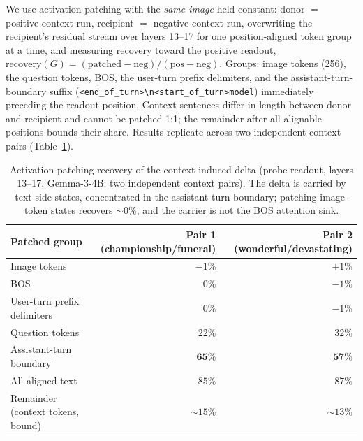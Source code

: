 \documentclass{article}
\newcommand{\gemma}{Gemma-3-4B}
\begin{document}
We use activation patching with the \emph{same image} held constant: donor $=$ positive-context run, recipient $=$ negative-context run, overwriting the recipient's residual stream over layers 13--17 for one position-aligned token group at a time, and measuring recovery toward the positive readout, $\mathrm{recovery}(G) = (\text{patched} - \text{neg})/(\text{pos} - \text{neg})$. Groups: image tokens (256), the question tokens, BOS, the user-turn prefix delimiters, and the assistant-turn-boundary suffix (\texttt{<end\_of\_turn>\textbackslash n<start\_of\_turn>model}) immediately preceding the readout position. Context sentences differ in length between donor and recipient and cannot be patched 1:1; the remainder after all alignable positions bounds their share. Results replicate across two independent context pairs (Table~\ref{tab:patching}).

\begin{table}[t]
  \caption{Activation-patching recovery of the context-induced delta (probe readout, layers 13--17, \gemma{}; two independent context pairs). The delta is carried by text-side states, concentrated in the assistant-turn boundary; patching image-token states recovers ${\sim}0\%$, and the carrier is not the BOS attention sink.}
  \label{tab:patching}
  \centering
  \begin{tabular}{lrr}
    \toprule
    Patched group & Pair 1 (championship/funeral) & Pair 2 (wonderful/devastating) \\
    \midrule
    Image tokens                 & $-1\%$ & $+1\%$ \\
    BOS                          & $0\%$  & $-1\%$ \\
    User-turn prefix delimiters  & $0\%$  & $-1\%$ \\
    Question tokens              & $22\%$ & $32\%$ \\
    Assistant-turn boundary      & $\mathbf{65\%}$ & $\mathbf{57\%}$ \\
    All aligned text             & $85\%$ & $87\%$ \\
    \midrule
    Remainder (context tokens, bound) & ${\sim}15\%$ & ${\sim}13\%$ \\
    \bottomrule
  \end{tabular}
\end{table}
\end{document}
